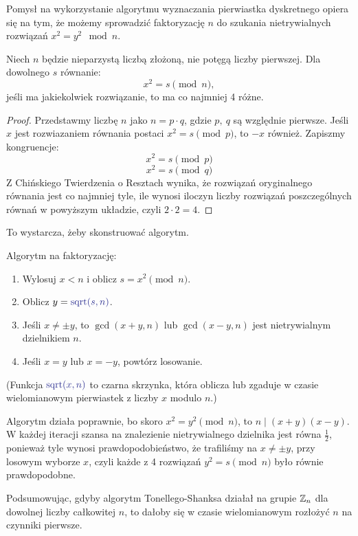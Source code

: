 Pomysł na wykorzystanie algorytmu wyznaczania pierwiastka dyskretnego opiera się na tym, że możemy sprowadzić faktoryzację \( n \) do szukania nietrywialnych rozwiązań \( x^2 = y^2 \mod n \).

\begin{lemma}
Niech \( n \) będzie nieparzystą liczbą złożoną, nie potęgą liczby pierwszej. Dla dowolnego \( s \) równanie:
\[
    x^2 = s \pmod{n},
\]
jeśli ma jakiekolwiek rozwiązanie, to ma co najmniej 4 różne.
\end{lemma}
\begin{proof}
    Przedstawmy liczbę \( n \) jako \( n = p \cdot q \), gdzie \( p, \ q \) są względnie pierwsze. Jeśli \( x \) jest rozwiazaniem równania postaci \( x^2 = s \pmod{p} \), to \( -x \) również. Zapiszmy kongruencje:
    \[
        x^2 = s \pmod{p}
    \]
    \[
        x^2 = s \pmod{q}
    \]
    Z Chińskiego Twierdzenia o Resztach wynika, że rozwiązań oryginalnego równania jest co najmniej tyle, ile wynosi iloczyn liczby rozwiązań poszczególnych równań w powyższym układzie, czyli \( 2 \cdot 2 = 4 \).
\end{proof}

To wystarcza, żeby skonstruować algorytm.
\begin{greyframe}
    Algorytm na faktoryzację:
    \begin{enumerate}
        \item Wylosuj \( x < n \) i oblicz \( s = x^2 \pmod{n} \).
        \item Oblicz \( y = \textcolor{Blue}{\text{sqrt}(s, n)} \).
        \item Jeśli \( x \neq \pm y \), to \( \gcd(x + y, n) \) lub \( \gcd(x - y, n) \) jest nietrywialnym dzielnikiem \( n \).
        \item Jeśli \( x = y \) lub \( x = -y \), powtórz losowanie.
    \end{enumerate}
\end{greyframe}
{\small (Funkcja \( \textcolor{Blue}{\text{sqrt}(x, n)} \) to czarna skrzynka, która oblicza lub zgaduje w czasie wielomianowym pierwiastek z liczby \( x \) modulo \( n \).)}

Algorytm działa poprawnie, bo skoro \( x^2 = y^2 \pmod{n} \), to \( n \mid (x + y)(x - y) \). W każdej iteracji szansa na znalezienie nietrywialnego dzielnika jest równa \( \frac{1}{2} \), ponieważ tyle wynosi prawdopodobieństwo, że trafiliśmy na \( x \neq \pm y \), przy losowym wyborze \( x \), czyli każde z 4 rozwiązań \( y^2 = s \pmod{n} \) było równie prawdopodobne.

Podsumowując, gdyby algorytm Tonellego-Shanksa działał na grupie \( \mathbb{Z}_n \) dla dowolnej liczby całkowitej \( n \), to dałoby się w czasie wielomianowym rozłożyć \( n \) na czynniki pierwsze.